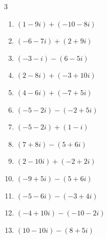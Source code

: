 \begin{multicols}{3}
\begin{enumerate}
        \phantom{$\displaystyle =-3-4i$}

  \item $\displaystyle (1-9i) + (-10-8i)$

        \phantom{$\displaystyle =-9-17i$}

  \item $\displaystyle (-6-7i) + (2+9i)$

        \phantom{$\displaystyle =-4+2i$}

  \item $\displaystyle (-3-i) - (6-5i)$

        \phantom{$\displaystyle =-9+4i$}

  \item $\displaystyle (2-8i) + (-3+10i)$

        \phantom{$\displaystyle =-1+2i$}

  \item $\displaystyle (4-6i) + (-7+5i)$

        \phantom{$\displaystyle =-3-i$}

  \item $\displaystyle (-5-2i) - (-2+5i)$

        \phantom{$\displaystyle =-3-7i$}

  \item $\displaystyle (-5-2i) + (1-i)$

        \phantom{$\displaystyle =-4-3i$}

  \item $\displaystyle (7+8i) - (5+6i)$

        \phantom{$\displaystyle =2+2i$}

  \item $\displaystyle (2-10i) + (-2+2i)$

        \phantom{$\displaystyle =-8i$}

  \item $\displaystyle (-9+5i) - (5+6i)$

        \phantom{$\displaystyle =-14-i$}

  \item $\displaystyle (-5-6i) - (-3+4i)$

        \phantom{$\displaystyle =-2-10i$}

  \item $\displaystyle (-4+10i) - (-10-2i)$

        \phantom{$\displaystyle =6+12i$}

  \item $\displaystyle (10-10i) - (8+5i)$


\end{enumerate}
\end{multicols}
